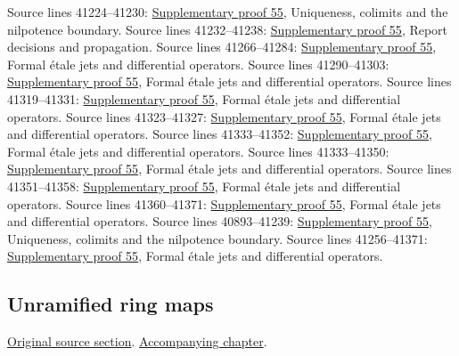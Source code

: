 \begin{AlgebraSourceRoutes}
 Source lines 41224--41230: \hyperlink{algebra_conormal_thickening_notes_20260928}{Supplementary proof 55}, Uniqueness, colimits and the nilpotence boundary.
 Source lines 41232--41238: \hyperlink{algebra_conormal_thickening_notes_20260928}{Supplementary proof 55}, Report decisions and propagation.
 Source lines 41266--41284: \hyperlink{algebra_conormal_thickening_notes_20260928}{Supplementary proof 55}, Formal étale jets and differential operators.
 Source lines 41290--41303: \hyperlink{algebra_conormal_thickening_notes_20260928}{Supplementary proof 55}, Formal étale jets and differential operators.
 Source lines 41319--41331: \hyperlink{algebra_conormal_thickening_notes_20260928}{Supplementary proof 55}, Formal étale jets and differential operators.
 Source lines 41323--41327: \hyperlink{algebra_conormal_thickening_notes_20260928}{Supplementary proof 55}, Formal étale jets and differential operators.
 Source lines 41333--41352: \hyperlink{algebra_conormal_thickening_notes_20260928}{Supplementary proof 55}, Formal étale jets and differential operators.
 Source lines 41333--41350: \hyperlink{algebra_conormal_thickening_notes_20260928}{Supplementary proof 55}, Formal étale jets and differential operators.
 Source lines 41351--41358: \hyperlink{algebra_conormal_thickening_notes_20260928}{Supplementary proof 55}, Formal étale jets and differential operators.
 Source lines 41360--41371: \hyperlink{algebra_conormal_thickening_notes_20260928}{Supplementary proof 55}, Formal étale jets and differential operators.
 Source lines 40893--41239: \hyperlink{algebra_conormal_thickening_notes_20260928}{Supplementary proof 55}, Uniqueness, colimits and the nilpotence boundary.
 Source lines 41256--41371: \hyperlink{algebra_conormal_thickening_notes_20260928}{Supplementary proof 55}, Formal étale jets and differential operators.
\end{AlgebraSourceRoutes}

\subsection{Unramified ring maps}
\hypertarget{algebra-source-section-unramified}{}
\noindent\href{https://github.com/stacks/stacks-project/blob/a04446e57ec1fbc252a871afcec7752fb2807b14/algebra.tex\#L41377}{Original source section}. \href{algebra.pdf\#nameddest=section-unramified}{Accompanying chapter}.

